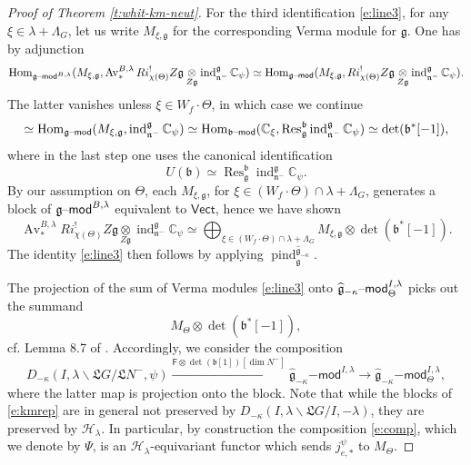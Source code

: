 \documentclass[11pt,reqno]{amsart}
\newcommand{\msf}{\mathsf}
\newcommand{\sH}{\mathscr{H}}
\newcommand{\fL}{\mathfrak{L}}
\newcommand{\fg}{\mathfrak{g}}
\newcommand{\fb}{\mathfrak{b}}
\newcommand{\fn}{\mathfrak{n}}
\newcommand{\on}{\operatorname}
\theoremstyle{remark}
\numberwithin{equation}{section}
\newcommand{\gmk}{\widehat{\fg}_{-\kappa}}
\newcommand{\Vect}{\mathsf{Vect}}
\renewcommand{\mod}{\text{\textendash}\mathsf{mod}}
\begin{document}
\begin{proof}[Proof of Theorem \ref{t:whit-km-neut}]
For the third identification \eqref{e:line3}, for any 
$\xi \in 
\lambda + \Lambda_G$, let us write $M_{\xi, \fg}$ for the corresponding Verma 
module for $\fg$.  One has by adjunction
%
\[
 \on{Hom}_{\fg\mod^{B, \lambda}}(M_{\xi, \fg},  \on{Av}^{B, \lambda}_{*} 
 Ri^!_{\chi(\Theta)} Z \fg 
 \underset{Z \fg}{\otimes} \on{ind}_{\fn^-}^{\fg} \mathbb{C}_\psi) \simeq 
 \on{Hom}_{\fg\mod}(M_{\xi, \fg},  Ri^!_{\chi(\Theta)} Z \fg 
 \underset{Z \fg}{\otimes} \on{ind}_{\fn^-}^{\fg} \mathbb{C}_\psi).
\]
%
The latter vanishes unless $\xi \in W_f \cdot \Theta$, in which 
case we continue 
%
\[ \simeq \on{Hom}_{\fg\mod}(M_{\xi, \fg}, \on{ind}_{\fn^-}^{\fg} 
\mathbb{C}_\psi) \simeq 
\on{Hom}_{\fb\mod}(\mathbb{C}_\xi, \on{Res}_{\fg}^{\fb} \on{ind}_{\fn^-}^{\fg} 
\mathbb{C}_\psi) \simeq \det(\fb^*[-1]),
\]
% 
where in the last step one uses the canonical identification 
%
\[ U(\fb) \simeq \on{Res}_{\fg}^{\fb} \on{ind}_{\fn^-}^{\fg} \mathbb{C}_\psi. \]
%
By our assumption on $\Theta$, each $M_{\xi, \fg}$, for $\xi \in (W_f \cdot 
\Theta) \cap \lambda + \Lambda_G$, generates a block of $\fg\mod^{B, \lambda}$ 
equivalent to $\Vect$, hence we have shown 
%
\[ \on{Av}_{*}^{B, \lambda} Ri^!_{\chi(\Theta)} Z \fg \underset{Z \fg}{\otimes} 
\on{ind}_{\fn^-}^{\fg} \mathbb{C}_\psi \simeq \bigoplus_{ \xi \in (W_f \cdot 
\Theta) \cap \lambda + \Lambda_G} 
M_{\xi, \fg} \otimes \det(\fb^*[-1]).
\]
%
The identity \eqref{e:line3} then follows by applying $\on{pind}_{\fg}^{\gmk}$. 


The projection of the sum of Verma modules \eqref{e:line3} onto $\gmk{\mod}^{I, 
\lambda}_\Theta$ picks out the summand \[M_\Theta \otimes \det(\fb^*[-1]),\] 
cf. 
Lemma 8.7 of 
\cite{lpw}. Accordingly, we consider the composition 
%
\begin{equation} \label{e:comp}
 D_{-\kappa}( I, \lambda \backslash \fL G / \fL N^-, \psi) \xrightarrow{ 
 \mathsf{F}\otimes \det( \fb[1]) [\dim N^-]} \gmk\msf{-mod}^{I, \lambda} 
 \rightarrow \gmk\msf{-mod}^{I, 
 \lambda}_\Theta,
\end{equation}
%
where the latter map is projection onto the block. Note that while the blocks 
of \eqref{e:kmrep} are in general not preserved by $D_{-\kappa}( I, \lambda 
\backslash \fL G / I, -\lambda)$, they are preserved by $\sH_\lambda$. In 
particular, by construction the composition \eqref{e:comp}, which we denote by 
$\Psi$, is an $\sH_\lambda$-equivariant functor which sends $j_{e, *}^\psi$ to 
$M_\Theta$. 


\end{proof}
\end{document}
